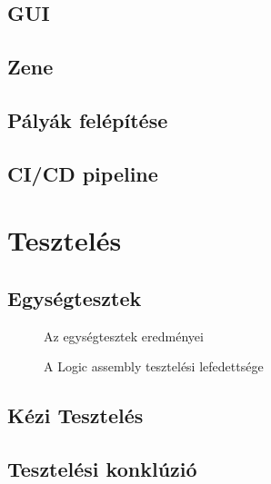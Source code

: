 \subsection{GUI}

\subsection{Zene}

\subsection{Pályák felépítése}

\subsection{CI/CD pipeline}

\cleardoublepage
\section{Tesztelés}

\subsection{Egységtesztek}

\begin{figure}[H]
	\noindent{}
	\caption{Az egységtesztek eredményei}
	\label{tests}
\end{figure}

\begin{figure}[H]
	\noindent{}
	\caption{A Logic assembly tesztelési lefedettsége}
	\label{codeCoverage}
\end{figure}


\subsection{Kézi Tesztelés}

\subsection{Tesztelési konklúzió}